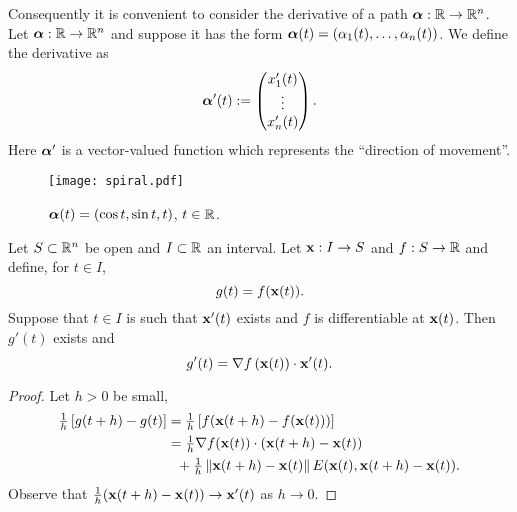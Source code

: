 Consequently it is convenient to consider the derivative of a path \(\boldsymbol{\alpha}:\mathbb{R} \to \mathbb{R}^n\).
Let \(\boldsymbol{\alpha}:\mathbb{R} \to \mathbb{R}^n\) and suppose it has the form
\(\boldsymbol{\alpha}(t) = \left( \alpha_1(t), \ldots, \alpha_n(t)  \right)\).
We define the derivative as
\[
    \boldsymbol{\alpha}'(t) := \begin{pmatrix}
        x_1'(t) \\
        \vdots  \\
        x_n'(t)
    \end{pmatrix}.
\]
\noindent
Here \(\boldsymbol{\alpha}'\) is a vector-valued function which represents the ``direction of movement''.

\begin{figure}[htb]
    \begin{center}
        \texttt{[image: spiral.pdf]}
        \caption{\(\boldsymbol{\alpha}(t)=(\cos t, \sin t, t)\), \(t\in \mathbb{R}\).}
        \label{fig:spiral}
    \end{center}
\end{figure}


\begin{theorem*}
    Let \(S\subset \mathbb{R}^n\) be open and \(I\subset \mathbb{R}\) an interval.
    Let \(\mathbf{x}: I \to S\) and \(f:S \to \mathbb{R}\) and define, for \(t\in I\),
    \[
        g(t) = f (\mathbf{x}(t)).
    \]
    Suppose that  \(t\in I\) is such that \(\mathbf{x}'(t)\) exists and \(f\) is differentiable at \(\mathbf{x}(t)\).
    Then \(g'(t)\) exists and
    \[
        g'(t) = \nabla f \left(\mathbf{x}(t)\right) \cdot \mathbf{x}'(t).
    \]
\end{theorem*}


\begin{proof}
    Let \(h>0\) be small, \vspace{-.5em}
    \[
        \begin{aligned}
            \tfrac{1}{h}\left[g(t+h)-g(t) \right]
             & = \tfrac{1}{h}\left[f(\mathbf{x}(t+h)-f(\mathbf{x}(t)))\right]                        \\
             & = \tfrac{1}{h} \nabla f(\mathbf{x}(t))\cdot (\mathbf{x}(t+h)-\mathbf{x}(t))                  \\
             & \ \ +  \tfrac{1}{h}  \left\|\mathbf{x}(t+h)-\mathbf{x}(t)\right\| E(\mathbf{x}(t), \mathbf{x}(t+h)-\mathbf{x}(t)).
        \end{aligned}
    \]
    Observe that \(\tfrac{1}{h}  (\mathbf{x}(t+h)-\mathbf{x}(t)) \to \mathbf{x}'(t)  \) as \(h\to 0\).
\end{proof}


